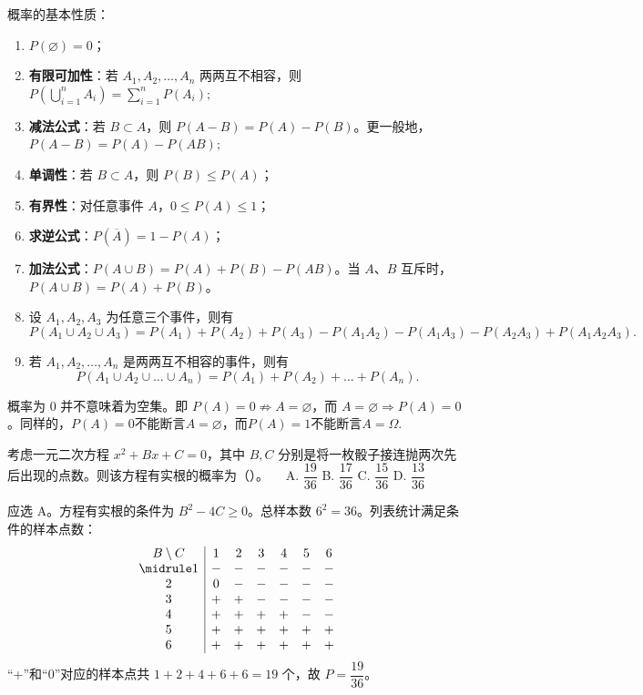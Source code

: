 \documentclass[lang=cn,11pt]{elegantbook}
\begin{document}
\begin{property}\label{prop:probability-basic}
概率的基本性质：
\begin{enumerate}
    \item \(P(\varnothing) = 0\)；
    \item \textbf{有限可加性}：若 \(A_1, A_2, \dots, A_n\) 两两互不相容，则
    \(
    P\!\left(\bigcup_{i=1}^{n} A_i\right) = \sum_{i=1}^{n} P(A_i);
    \)
    \item \textbf{减法公式}：若 \(B \subset A\)，则 \(P(A - B) = P(A) - P(B)\)。更一般地，
    \(
    P(A - B) = P(A) - P(AB);
    \)
    \item \textbf{单调性}：若 \(B \subset A\)，则 \(P(B) \le P(A)\)；
    \item \textbf{有界性}：对任意事件 \(A\)，\(0 \le P(A) \le 1\)；
    \item \textbf{求逆公式}：\(P(\overline{A}) = 1 - P(A)\)；
    \item \textbf{加法公式}：\(P(A \cup B) = P(A) + P(B) - P(AB)\)。当 \(A\)、\(B\) 互斥时，\(P(A \cup B) = P(A) + P(B)\)。
    \item 设 \(A_1, A_2, A_3\) 为任意三个事件，则有
    \[
    P(A_1 \cup A_2 \cup A_3) = P(A_1) + P(A_2) + P(A_3) - P(A_1A_2) - P(A_1A_3) - P(A_2A_3) + P(A_1A_2A_3).
    \]
    \item 若 \(A_1, A_2, \dots, A_n\) 是两两互不相容的事件，则有
    \[
    P(A_1 \cup A_2 \cup \dots \cup A_n) = P(A_1) + P(A_2) + \dots + P(A_n).
    \]
\end{enumerate}
\end{property}



\begin{note}
概率为 0 并不意味着为空集。即 \(P(A) = 0 \nRightarrow A = \varnothing\)，而 \(A = \varnothing \Rightarrow P(A) = 0\)。同样的，$P(A) = 0$不能断言$A = \varnothing$，而$P(A) = 1$不能断言$A = \Omega$.
\end{note}


\begin{exercise}\label{exer:1-35}
考虑一元二次方程 \(x^2+Bx+C=0\)，其中 \(B,C\) 分别是将一枚骰子接连抛两次先后出现的点数。则该方程有实根的概率为（\quad）。~~
A. \(\dfrac{19}{36}\)\quad
B. \(\dfrac{17}{36}\)\quad
C. \(\dfrac{15}{36}\)\quad
D. \(\dfrac{13}{36}\)
\end{exercise}

\begin{solution}
应选 A。方程有实根的条件为 \(B^2-4C\ge 0\)。总样本数 \(6^2=36\)。列表统计满足条件的样本点数：
\[
\begin{array}{c|cccccc}
B\setminus C & 1 & 2 & 3 & 4 & 5 & 6 \\
\midrule
1 & - & - & - & - & - & - \\
2 & 0 & - & - & - & - & - \\
3 & + & + & - & - & - & - \\
4 & + & + & + & + & - & - \\
5 & + & + & + & + & + & + \\
6 & + & + & + & + & + & + \\
\end{array}
\]
``+''和``0''对应的样本点共 \(1+2+4+6+6=19\) 个，故 \(P=\dfrac{19}{36}\)。
\end{solution}
\end{document}
